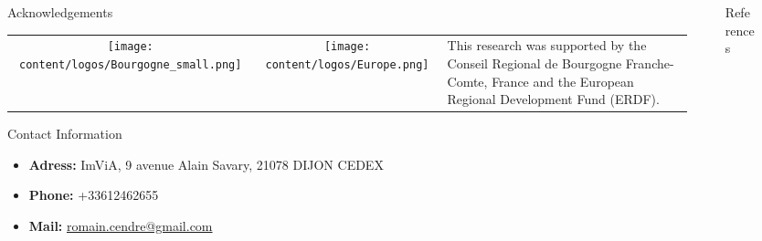 \documentclass[final]{beamer}
\newlength{\sepmargin}
\newlength{\sepwid}
\newlength{\onecolwid}
\begin{document}
\begin{frame}[t]
\begin{columns}[t]
        \begin{column}{\sepmargin}\end{column} %
        \begin{column}{\onecolwid} %
            \begin{block}{\large Acknowledgements}
                \begin{center}
    				\begin{tabular}{SSL}     				    \texttt{[image: content/logos/Bourgogne\_small.png]}  &		\texttt{[image: content/logos/Europe.png]}  &	
    				    \footnotesize This research was supported by the Conseil Regional de Bourgogne Franche-Comte, France and the European Regional Development Fund (ERDF).
    				\end{tabular}
				\end{center}
			\end{block}	
            \vspace*{-0.9cm}
			\begin{alertblock}{\large Contact Information}
                \vspace*{-0.5cm}
				\begin{footnotesize}
					\begin{itemize}
					    \item \textbf{Adress:} ImViA, 9 avenue Alain Savary, 21078 DIJON CEDEX
    					\item \textbf{Phone:} +33612462655
						\item \textbf{Mail:} \href{mailto:romain.cendre@gmail.com}{romain.cendre@gmail.com}
					\end{itemize}
				\end{footnotesize}	
			\end{alertblock}
	    \end{column} %
		\begin{column}{\sepwid}\end{column} %
		\begin{column}{\onecolwid} %
            \begin{block}{\large References}
				\footnotesize 
                
                
            \end{block} 
        \end{column} %
            
	    \begin{column}{\sepmargin}\end{column} %
            
    \end{columns} %

\end{frame} %
	
\end{document}
